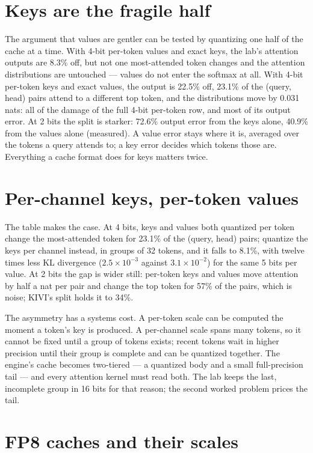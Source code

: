 \section{Keys are the fragile half}

The argument that values are gentler can be tested by quantizing one half of the
cache at a time. With 4-bit per-token values and exact keys, the lab's attention
outputs are 8.3\% off, but not one most-attended token changes and the attention
distributions are untouched --- values do not enter the softmax at all. With 4-bit
per-token keys and exact values, the output is 22.5\% off, 23.1\% of the
(query, head) pairs attend to a different top token, and the distributions move
by 0.031 nats: all of the damage of the full 4-bit per-token row, and most of
its output error. At 2 bits the split is starker: 72.6\% output error from the
keys alone, 40.9\% from the values alone (measured). A value error stays where it
is, averaged over the tokens a query attends to; a key error decides which tokens
those are. Everything a cache format does for keys matters twice.

\section{Per-channel keys, per-token values}

The table makes the case. At 4 bits, keys and values both quantized per token
change the most-attended token for 23.1\% of the (query, head) pairs; quantize
the keys per channel instead, in groups of 32 tokens, and it falls to 8.1\%,
with twelve times less KL divergence ($2.5\times10^{-3}$ against
$3.1\times10^{-2}$) for the same 5 bits per value. At 2 bits the gap is wider
still: per-token keys and values move attention by half a nat per pair and
change the top token for 57\% of the pairs, which is noise; KIVI's split holds
it to 34\%.

The asymmetry has a systems cost. A per-token scale can be computed the moment a
token's key is produced. A per-channel scale spans many tokens, so it cannot be
fixed until a group of tokens exists; recent tokens wait in higher precision
until their group is complete and can be quantized together. The engine's
cache becomes two-tiered --- a quantized body and a small full-precision tail
--- and every attention kernel must read both. The lab keeps the last,
incomplete group in 16 bits for that reason; the second worked problem prices
the tail.

\section{FP8 caches and their scales}


